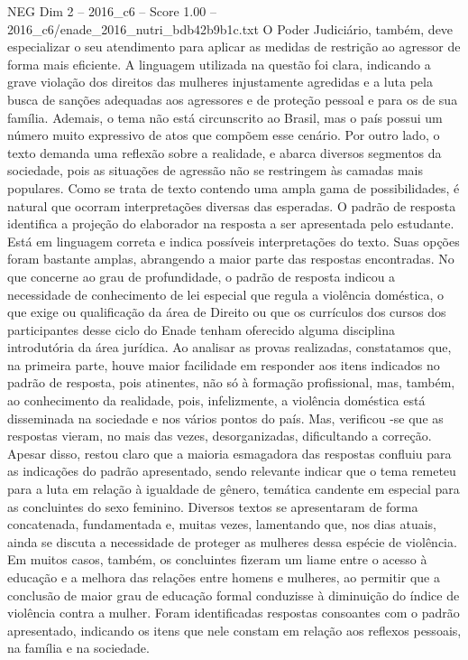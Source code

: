 \begin{textsample}{NEG Dim 2 – 2016\_c6 – Score 1.00 – 2016\_c6/enade\_2016\_nutri\_bdb42b9b1c.txt}
O Poder Judiciário, também, deve especializar o seu atendimento para aplicar as medidas de restrição ao agressor de forma mais eficiente.
A linguagem utilizada na questão foi clara, indicando a grave violação dos direitos das mulheres injustamente agredidas e a luta pela busca de sanções adequadas aos agressores e de proteção pessoal e para os de sua família.
Ademais, o tema não está circunscrito ao Brasil, mas o país possui um número muito expressivo de atos que compõem esse cenário.
Por outro lado, o texto demanda uma reflexão sobre a realidade, e abarca diversos segmentos da sociedade, pois as situações de agressão não se restringem às camadas mais populares.
Como se trata de texto contendo uma ampla gama de possibilidades, é natural que ocorram interpretações diversas das esperadas.
O padrão de resposta identifica a projeção do elaborador na resposta a ser apresentada pelo estudante.
Está em linguagem correta e indica possíveis interpretações do texto.
Suas opções foram bastante amplas, abrangendo a maior parte das respostas encontradas.
No que concerne ao grau de profundidade, o padrão de resposta indicou a necessidade de conhecimento de lei especial que regula a violência doméstica, o que exige ou qualificação da área de Direito ou que os currículos dos cursos dos participantes desse ciclo do Enade tenham oferecido alguma disciplina introdutória da área jurídica.
Ao analisar as provas realizadas, constatamos que, na primeira parte, houve maior facilidade em responder aos itens indicados no padrão de resposta, pois atinentes, não só à formação profissional, mas, também, ao conhecimento da realidade, pois, infelizmente, a violência doméstica está disseminada na sociedade e nos vários pontos do país.
Mas, verificou -se que as respostas vieram, no mais das vezes, desorganizadas, dificultando a correção.
Apesar disso, restou claro que a maioria esmagadora das respostas confluiu para as indicações do padrão apresentado, sendo relevante indicar que o tema remeteu para a luta em relação à igualdade de gênero, temática candente em especial para as concluintes do sexo feminino.
Diversos textos se apresentaram de forma concatenada, fundamentada e, muitas vezes, lamentando que, nos dias atuais, ainda se discuta a necessidade de proteger as mulheres dessa espécie de violência.
Em muitos casos, também, os concluintes fizeram um liame entre o acesso à educação e a melhora das relações entre homens e mulheres, ao permitir que a conclusão de maior grau de educação formal conduzisse à diminuição do índice de violência contra a mulher.
Foram identificadas respostas consoantes com o padrão apresentado, indicando os itens que nele constam em relação aos reflexos pessoais, na família e na sociedade.

\end{textsample}
